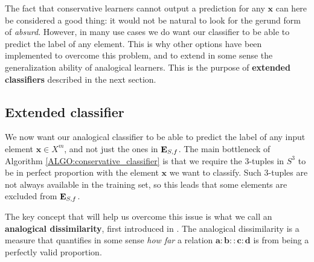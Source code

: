 The fact that conservative learners cannot output a prediction for any
$\mathbf{x}$ can here be considered a good thing: it would not be natural to
look for the gerund form of \textit{absurd}. However, in many use cases we do
want our classifier to be able to predict the label of any element. This is why
other options have been implemented to overcome this problem, and to extend in
some sense the generalization ability of analogical learners. This is the
purpose of \textbf{extended classifiers} described in the next section.

\subsection{Extended classifier}
\label{SEC:extended_classifier}

We now want our analogical classifier to be able to predict the label of any
input element $\mathbf{x} \in X^m$, and not just the ones in $\mathbf{E}_{S,f}$.
The main bottleneck of Algorithm \ref{ALGO:conservative_classifier} is that we
require the 3-tuples in $S^3$ to be in perfect proportion with the element
$\mathbf{x}$ we want to classify. Such 3-tuples are not always available in the
training set, so this leads that some elements are excluded from $\mathbf{E}_{S,f}$.

The key concept that will help us overcome this issue is what we call an
\textbf{analogical dissimilarity}, first introduced in
\cite{BayMicDelIJCAI07}. The analogical dissimilarity is a measure that
quantifies in some sense \textit{how far} a relation $\mathbf{a} : \mathbf{b}
:: \mathbf{c} : \mathbf{d}$ is from being a perfectly valid proportion.

